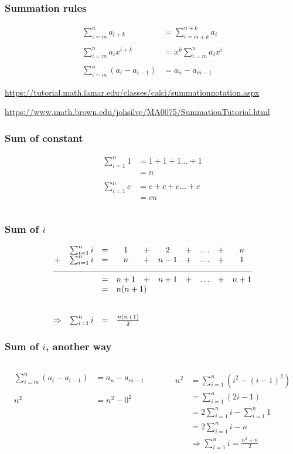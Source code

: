 \documentclass{beamer}
\newcommand{\bfr}[1]{\begin{frame}[fragile]\frametitle{{ #1 }}}
\newcommand{\cola}{\begin{columns}\begin{column}{0.5\textwidth}}
\newcommand{\colb}{\end{column}\begin{column}{0.5\textwidth}}
\newcommand{\colc}{\end{column}\end{columns}}
\begin{document}
\bfr{Summation rules}

\begin{align*}
\sum_{i=m}^n a_{i+k} &= \sum_{i=m+k}^{n+k} a_{i}
\\\\
\sum_{i=m}^n a_{i}x^{i+k} &= x^k \sum_{i=m}^{n} a_{i}x^i
\\\\
\sum_{i=m}^n (a_i - a_{i-1}) &= a_n - a_{m-1}
\end{align*}

\centerline{\scriptsize
\url{https://tutorial.math.lamar.edu/classes/calci/summationnotation.aspx}
}

\centerline{\scriptsize
\url{https://www.math.brown.edu/johsilve/MA0075/SummationTutorial.html}
}

\end{frame}

\bfr{Sum of constant}

\begin{align*}
  \sum_{i=1}^n 1 &=  1+1+1\ldots+1\\&=n\\
                 \\
  \sum_{i=1}^n c &=  c+c+c\ldots+c\\&=cn\\\\
\end{align*}
\end{frame}

\bfr{Sum of $i$}
\[
\begin{array}{cccccccccc}
 & \sum_{i=1}^n i &=& 1 &+& 2 &+& \ldots  &+& n
\\
+&  \sum_{i=1}^n i  &=& n &+& n-1 &+& \ldots  &+& 1
\\
\multicolumn{10}{c}{\hrulefill}
\\
 &&=& n+1 &+& n+1 &+& \ldots  &+& n+1
  \\
 & &=& \multicolumn{3}{l}{n(n+1)}
  \\\\\\
\Rightarrow&  \sum_{i=1}^n i &=& \multicolumn{3}{l}{\frac{n(n+1)}{2}}
\end{array}
\]
\end{frame}

\bfr{Sum of $i$, another way}
\cola
\begin{align*}
\sum_{i=m}^n (a_i - a_{i-1}) &= a_n - a_{m-1}\\\\\\
  n^2 &= n^2 - 0^2
\end{align*}
\colb
\begin{align*}
  n^2&= \sum_{i=1}^n (i^2 - (i-1)^2)
  \\
  &= \sum_{i=1}^n (2i - 1)
  \\
  &= 2\sum_{i=1}^n i - \sum_{i=1}^n 1
  \\
  &= 2\sum_{i=1}^n i - n
  \\
  &\Rightarrow  \sum_{i=1}^n i = \frac{n^2+n}{2}
\end{align*}
\colc
\end{frame}
\end{document}
